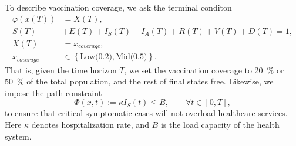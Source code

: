 To describe vaccination coverage, we ask the terminal conditon
\begin{equation}
    \label{eqn:coverage_constrain}
    \begin{aligned}
     \varphi(x(T))&=X(T),
        \\
        S(T) &+ E(T) + I_S(T) + I_A(T) + R(T) + V(T) + D(T) = 1,
        \\
        X(T)
        &= x_{cover age},
        \\
        x_{coverage}
        & \in
        \left \{
        \text{Low(0.2)},\text{Mid(0.5)}
        \right \} .
    \end{aligned}
\end{equation}
That is, given the time horizon $T$, we set the vaccination coverage to 
\SI{20}{\percent} or \SI{50}{\percent} of the total population, and the rest 
of final states free. Likewise, we impose the path constraint
\begin{equation}
    \label{eqn:path_constrain}
    \Phi(x,t):= \kappa I_S(t) \leq B,
    \qquad \forall t \in [0, T],
\end{equation}
to ensure that critical symptomatic cases
will not overload healthcare services. Here $\kappa$
denotes hospitalization rate, and $B$ is the load capacity of the
health system. 


